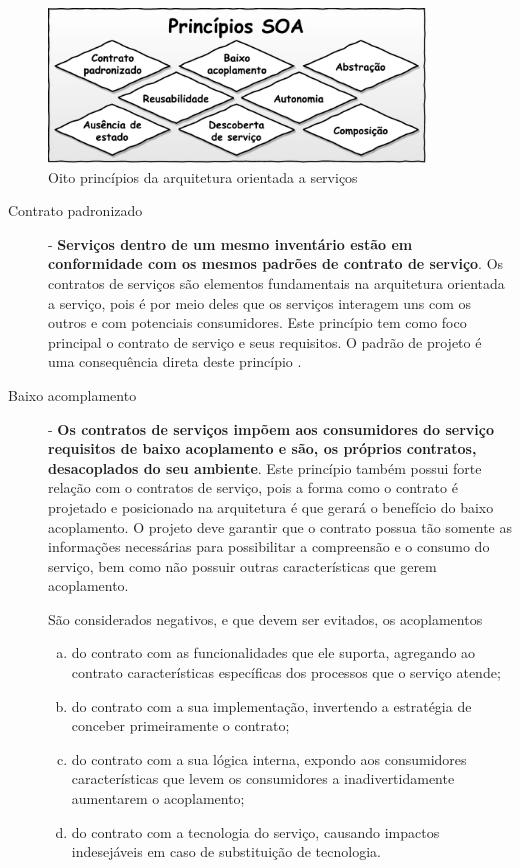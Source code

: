 \begin{figure}[!htb]
\centering
\includegraphics[width=100mm,trim = 0mm 0mm 0mm 
0mm,clip]{img/PrincipiosSOA.pdf}
\caption{Oito princípios da arquitetura orientada a serviços}
\label{Fig:PrincipiosSoa}
\end{figure}

\begin{description}
\item[Contrato padronizado] - \textbf{Serviços dentro de um mesmo inventário
estão em conformidade com os mesmos padrões de contrato de serviço}.
Os contratos de serviços são elementos fundamentais na arquitetura orientada a
serviço, pois é por meio deles que os serviços interagem uns com os outros e com
potenciais consumidores. Este princípio tem como foco principal o contrato de
serviço e seus requisitos. O padrão de projeto \CtFirst{} é uma
consequência direta deste princípio \cite{erl2009web}.

\item[Baixo acomplamento] - \textbf{Os contratos de serviços impõem aos
consumidores do serviço requisitos de baixo acoplamento e são, os próprios
contratos, desacoplados do seu ambiente}. 
Este princípio também possui forte relação com o contratos de serviço, pois a
forma como o contrato é projetado e posicionado na arquitetura é que gerará o
benefício do baixo acoplamento. O projeto deve garantir que o contrato
possua tão somente as informações necessárias para possibilitar a compreensão e
o consumo do serviço, bem como não possuir outras características que gerem
acoplamento.

São considerados negativos, e que devem ser evitados, os acoplamentos  
\begin{enumerate}[(a)] 
\item do contrato com as funcionalidades que ele suporta, agregando ao
contrato características específicas dos processos que o serviço atende;
\item do contrato com a sua implementação, invertendo a estratégia de conceber
primeiramente o contrato;
\item do contrato com a sua lógica interna, expondo aos consumidores
características que levem os consumidores a inadivertidamente aumentarem o
acoplamento;
\item do contrato com a tecnologia do serviço, causando impactos indesejáveis em
caso de substituição de tecnologia.
\end{enumerate}


\end{description}
